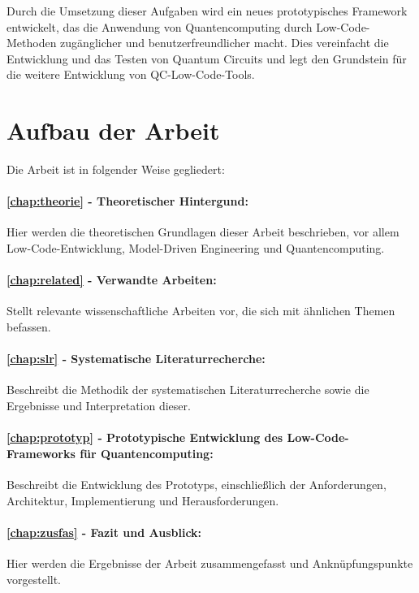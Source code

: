 Durch die Umsetzung dieser Aufgaben wird ein neues prototypisches Framework entwickelt, 
das die Anwendung von Quantencomputing durch Low-Code-Methoden zugänglicher und benutzerfreundlicher 
macht. Dies vereinfacht die Entwicklung und das Testen von Quantum Circuits und legt den 
Grundstein für die weitere Entwicklung von QC-Low-Code-Tools.




\section*{Aufbau der Arbeit}

Die Arbeit ist in folgender Weise gegliedert:
\paragraph{\cref{chap:theorie} - Theoretischer Hintergund:} Hier werden die theoretischen Grundlagen dieser Arbeit beschrieben, vor 
allem Low-Code-Entwicklung, Model-Driven Engineering und Quantencomputing.
\paragraph{\cref{chap:related} - Verwandte Arbeiten:} Stellt relevante wissenschaftliche Arbeiten vor, die sich mit ähnlichen Themen befassen.
\paragraph{\cref{chap:slr} - Systematische Literaturrecherche:} Beschreibt die Methodik der systematischen Literaturrecherche sowie die Ergebnisse 
und Interpretation dieser.
\paragraph{\cref{chap:prototyp} - Prototypische Entwicklung des Low-Code-Frameworks für Quantencomputing:} Beschreibt die 
Entwicklung des Prototyps, einschließlich der Anforderungen, Architektur, Implementierung und Herausforderungen.
\paragraph{\cref{chap:zusfas} - Fazit und Ausblick:} Hier werden die Ergebnisse der Arbeit zusammengefasst und Anknüpfungspunkte vorgestellt.
